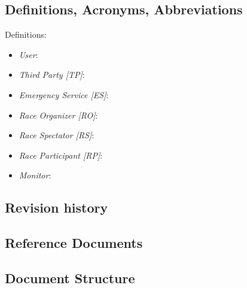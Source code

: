 \subsection{Definitions, Acronyms, Abbreviations}
Definitions:
\begin{itemize}
\item \textit{User}:
\item \textit{Third Party [TP]}:
\item \textit{Emergency Service [ES]}:
\item \textit{Race Organizer [RO]}:
\item \textit{Race Spectator [RS]}:
\item \textit{Race Participant [RP]}:
\item \textit{Monitor}:
\end{itemize}

\subsection{Revision history}
\subsection{Reference Documents }
\subsection{Document Structure}

